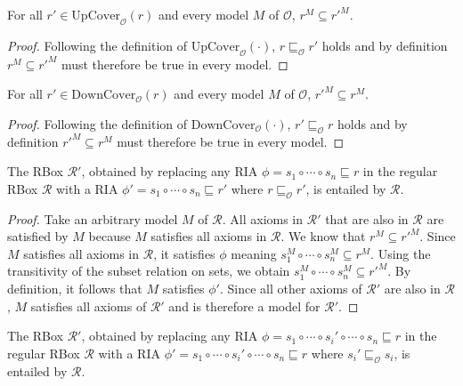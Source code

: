 \begin{lemma} \label{lem:subseteq-up}
For all $r' \in \mathrm{UpCover}_\mathcal{O}(r)$ and every model $M$ of $\mathcal{O}$, $r^M \subseteq r'^M$.
\end{lemma}

\begin{proof}
Following the definition of $\mathrm{UpCover}_\mathcal{O}(\cdot)$, $r \sqsubseteq_\mathcal{O} r'$ holds and by definition $r^M \subseteq r'^M$ must therefore be true in every model.
\end{proof}

\begin{lemma} \label{lem:subseteq-down}
For all $r' \in \mathrm{DownCover}_\mathcal{O}(r)$ and every model $M$ of $\mathcal{O}$, $r'^M \subseteq r^M$.
\end{lemma}

\begin{proof}
Following the definition of $\mathrm{DownCover}_\mathcal{O}(\cdot)$, $r' \sqsubseteq_\mathcal{O} r$ holds and by definition $r'^M \subseteq r^M$ must therefore be true in every model.
\end{proof}

\begin{lemma} \label{lem:entailed-right}
The RBox $\mathcal{R}'$, obtained by replacing any RIA $\phi = s_1 \circ \cdots \circ s_n \sqsubseteq r$ in the regular RBox $\mathcal{R}$ with a RIA $\phi' = s_1 \circ \cdots \circ s_n \sqsubseteq r'$ where $r \sqsubseteq_\mathcal{O} r'$, is entailed by $\mathcal{R}$.
\end{lemma}

\begin{proof}
Take an arbitrary model $M$ of $\mathcal{R}$.
All axioms in $\mathcal{R}'$ that are also in $\mathcal{R}$ are satisfied by $M$ because $M$ satisfies all axioms in $\mathcal{R}$.
We know that $r^M \subseteq r'^M$.
Since $M$ satisfies all axioms in $\mathcal{R}$, it satisfies $\phi$ meaning $s_1^M \circ \cdots \circ s_n^M \subseteq r^M$.
Using the transitivity of the subset relation on sets, we obtain $s_1^M \circ \cdots \circ s_n^M \subseteq r'^M$.
By definition, it follows that $M$ satisfies $\phi'$.
Since all other axioms of $\mathcal{R}'$ are also in $\mathcal{R}$, $M$ satisfies all axioms of $\mathcal{R}'$ and is therefore a model for $\mathcal{R}'$.
\end{proof}

\begin{lemma} \label{lem:entailed-left}
The RBox $\mathcal{R}'$, obtained by replacing any RIA $\phi = s_1 \circ \cdots \circ s_i' \circ \cdots \circ s_n \sqsubseteq r$ in the regular RBox $\mathcal{R}$ with a RIA $\phi' = s_1 \circ \cdots \circ s_i' \circ \cdots \circ s_n \sqsubseteq r$ where $s_i' \sqsubseteq_\mathcal{O} s_i$, is entailed by $\mathcal{R}$.
\end{lemma}

